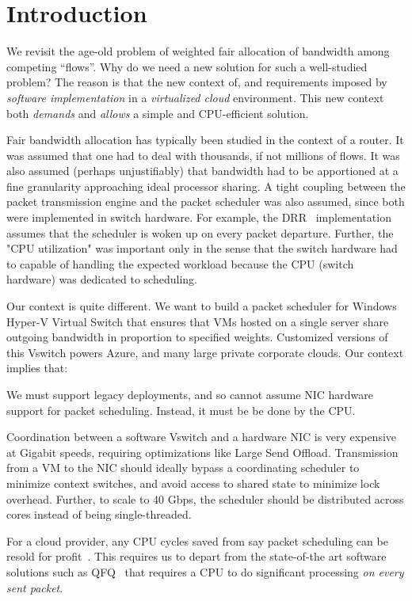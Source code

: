 \section {Introduction}

We revisit the age-old problem of weighted fair allocation of bandwidth among
competing ``flows''. Why do we need a new solution for such a well-studied
problem? The reason is that the new context of, and requirements imposed by {\em
software implementation} in a {\em virtualized cloud} environment. This new
context both {\em demands} and {\em allows} a simple and CPU-efficient solution. 

Fair bandwidth allocation has typically been studied in the context of a router.
It was assumed that one had to deal with thousands, if not millions of flows. It
was also assumed (perhaps unjustifiably) that bandwidth had to be apportioned at
a fine granularity approaching ideal processor sharing. A tight coupling between
the packet transmission engine and the packet scheduler was also assumed, since
both were implemented in switch hardware.  For example, the DRR~\cite{drr}
implementation assumes that the scheduler is woken up on every packet departure.
Further, the "CPU utilization" was important only in the sense that the switch
hardware had to capable of handling the expected workload because the CPU
(switch hardware) was dedicated to scheduling.

Our context is quite different. We want to build a packet scheduler for Windows
Hyper-V Virtual Switch that ensures that VMs hosted on a single server share
outgoing bandwidth in proportion to specified weights. Customized versions of
this Vswitch powers Azure, and many large private corporate clouds. Our context
implies that:

 We must support legacy
deployments, and so cannot assume NIC hardware support for packet scheduling.
Instead, it must be be done by the CPU.

 Coordination between a software
Vswitch and a hardware NIC is very expensive at Gigabit speeds, requiring
optimizations like Large Send Offload.  Transmission from a VM to the NIC should
ideally bypass a coordinating scheduler to minimize context switches, and avoid
access to shared state to minimize lock overhead.  Further, to scale to 40 Gbps,
the scheduler should be distributed across cores instead of being
single-threaded. 

 For a cloud provider, any CPU cycles
saved from say packet scheduling can be resold for profit~\cite{aws}.  This
requires us to depart from the state-of-the art software solutions such as
QFQ~\cite{qfq} that requires a CPU to do significant processing {\em on every
sent packet}.

